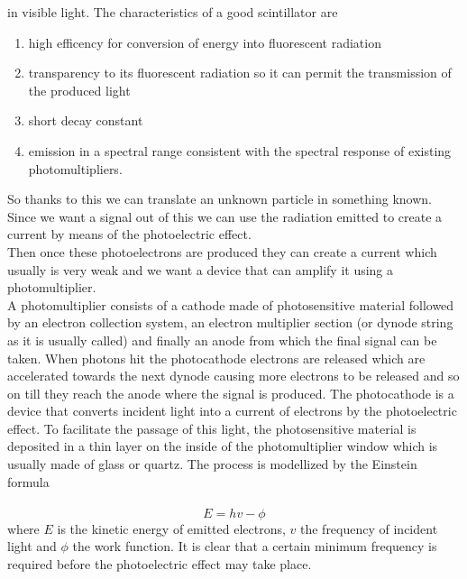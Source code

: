 in visible light. The characteristics of a good scintillator are
\begin{enumerate}
   \item high efficency for conversion of energy into fluorescent radiation
    \item transparency to its fluorescent radiation so it can permit the transmission of the produced light
    \item short decay constant
    \item emission in a spectral range consistent with the spectral response of existing photomultipliers. 
\end{enumerate}
So thanks to this we can translate an unknown particle in something known. 
Since we want a signal out of this we can use the radiation emitted to create a current 
by means of the photoelectric effect.\\ 
Then once these photoelectrons are produced they can create a current which usually is very
weak and we want a device that can amplify it using a photomultiplier.\\
A photomultiplier consists of a cathode made of photosensitive material followed by an
electron collection system, an electron multiplier section (or dynode string as it is usually called)
and finally an anode from which the final signal can be taken.
When photons hit the photocathode electrons are released which are accelerated towards
the next dynode causing more electrons to be released and so on till they reach the anode
where the signal is produced. The photocathode is a device that converts incident light
into a current of electrons by the photoelectric effect. To facilitate the passage of this light,
the photosensitive material is deposited in a thin layer on the inside of the photomultiplier
window which is usually made of glass or quartz.
The process is modellized by the Einstein formula\\\\
\begin{equation*}
E=hv - \phi 
\end{equation*}
where $E$ is the kinetic energy of emitted electrons, $v$ the frequency of incident light
and $\phi$ the work function. It is clear that a certain minimum frequency
is required before the photoelectric effect may take place.
